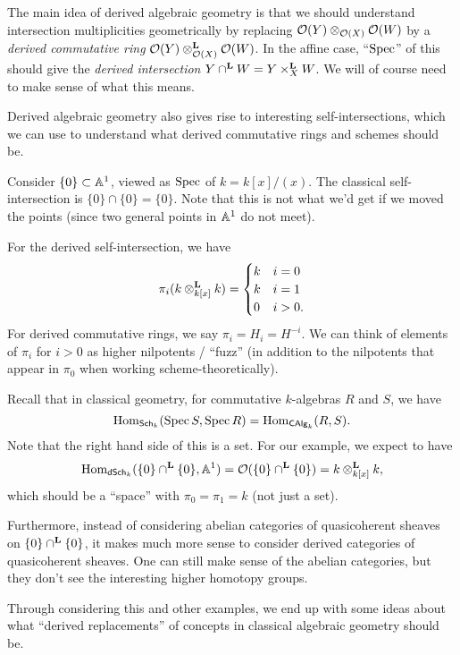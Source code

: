 \documentclass{amsart}
\begin{document}
The main idea of derived algebraic geometry is that we should understand intersection multiplicities geometrically by replacing $\Oc(Y) \otimes_{\Oc(X)} \Oc(W)$ by a \emph{derived commutative ring} $\Oc(Y) \otimes_{\Oc(X)}^\Lbf \Oc(W)$.
In the affine case, ``$\Spec$'' of this should give the \emph{derived intersection} $Y \cap^\Lbf W = Y \times_X^\Lbf W$.
We will of course need to make sense of what this means.

Derived algebraic geometry also gives rise to interesting self-intersections, which we can use to understand what derived commutative rings and schemes should be.

\begin{ex}
Consider $\{0\} \subset \AA^1$, viewed as $\Spec$ of $k = k[x] / (x)$.
The classical self-intersection is $\{0\} \cap \{0\} = \{0\}$.
Note that this is not what we'd get if we moved the points (since two general points in $\AA^1$ do not meet).

For the derived self-intersection, we have 
\[
\pi_i(k \otimes_{k[x]}^\Lbf k) = \begin{cases}
	k & i = 0 \\
	k & i = 1 \\
	0 & i > 0.
\end{cases}
\]
For derived commutative rings, we say $\pi_i = H_i = H^{-i}$.
We can think of elements of $\pi_i$ for $i > 0$ as higher nilpotents / ``fuzz'' (in addition to the nilpotents that appear in $\pi_0$ when working scheme-theoretically).

Recall that in classical geometry, for commutative $k$-algebras $R$ and $S$, we have
\[
\Hom_{\Sch_k}(\Spec S, \Spec R) = \Hom_{\CAlg_k}(R, S).
\]
Note that the right hand side of this is a set.
For our example, we expect to have
\[
\Hom_{\dSch_k}(\{0\} \cap^\Lbf \{0\}, \AA^1) = \Oc(\{0\} \cap^\Lbf \{0\}) = k \otimes_{k[x]}^\Lbf k,
\]
which should be a ``space'' with $\pi_0 = \pi_1 = k$ (not just a set).

Furthermore, instead of considering abelian categories of quasicoherent sheaves on $\{0\} \cap^\Lbf \{0\}$, it makes much more sense to consider derived categories of quasicoherent sheaves.
One can still make sense of the abelian categories, but they don't see the interesting higher homotopy groups.
\end{ex}

Through considering this and other examples, we end up with some ideas about what ``derived replacements'' of concepts in classical algebraic geometry should be.
\end{document}
